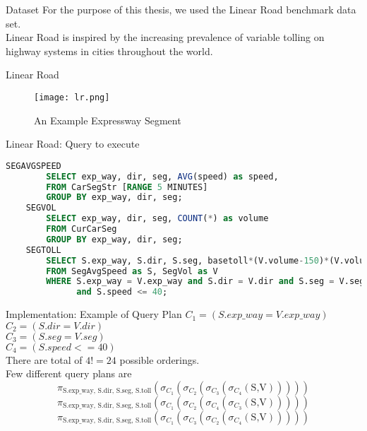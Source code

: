 \begin{frame}{Dataset}
    For the purpose of this thesis, we used the Linear Road benchmark data set.\\
    Linear Road is inspired by the increasing prevalence of variable tolling on highway systems in cities throughout the world.
\end{frame}


\begin{frame}{Linear Road}
    \begin{figure}
        \centering
        \texttt{[image: lr.png]}\\
        \caption{An Example Expressway Segment}
        \label{fig:lr_ex}
    \end{figure}
\end{frame}

\begin{frame}[fragile]{Linear Road: Query to execute}
    \begin{lstlisting}[language=SQL]
    SEGAVGSPEED
        SELECT exp_way, dir, seg, AVG(speed) as speed,
        FROM CarSegStr [RANGE 5 MINUTES]
        GROUP BY exp_way, dir, seg;
    SEGVOL
        SELECT exp_way, dir, seg, COUNT(*) as volume
        FROM CurCarSeg
        GROUP BY exp_way, dir, seg;
    SEGTOLL
        SELECT S.exp_way, S.dir, S.seg, basetoll*(V.volume-150)*(V.volume-150)
        FROM SegAvgSpeed as S, SegVol as V
        WHERE S.exp_way = V.exp_way and S.dir = V.dir and S.seg = V.seg
              and S.speed <= 40;
    \end{lstlisting}
\end{frame}

\begin{frame}{Implementation: Example of Query Plan}
$C_1=(S.exp\_way = V.exp\_way)$\\
$C_2=(S.dir = V.dir)$\\
$C_3=(S.seg = V.seg)$\\
$C_4=(S.speed <= 40)$\\
There are total of $4!=24$ possible orderings.\\
Few different query plans are
$$\pi_{\text{S.exp\_way, S.dir, S.seg, S.toll}}(\sigma_{C_1}(\sigma_{C_2}(\sigma_{C_3}(\sigma_{C_4}(\text{S,V})))))$$
$$\pi_{\text{S.exp\_way, S.dir, S.seg, S.toll}}(\sigma_{C_1}(\sigma_{C_2}(\sigma_{C_4}(\sigma_{C_3}(\text{S,V})))))$$
$$\pi_{\text{S.exp\_way, S.dir, S.seg, S.toll}}(\sigma_{C_1}(\sigma_{C_3}(\sigma_{C_2}(\sigma_{C_4}(\text{S,V})))))$$

\end{frame}

